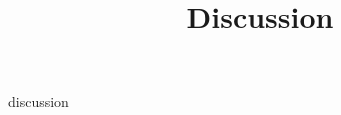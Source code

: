 \documentclass[10pt]{article}
\title{Discussion}
\date{}
\author{}
\begin{document}
\maketitle


{discussion}

% 

\end{document}
